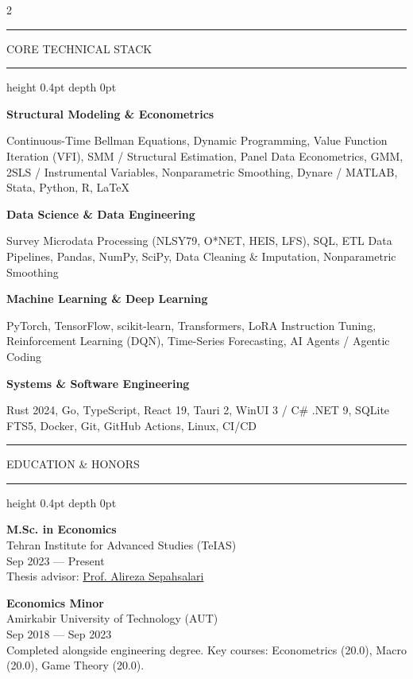 \documentclass[10pt,a4paper]{article}
\newcommand{\scorebadge}[1]{%
  \tcbox[on line, colback=chipbg, colframe=chipborder, arc=2pt, boxrule=0.45pt, boxsep=0pt, left=3.5pt, right=3.5pt, top=1.2pt, bottom=1.2pt]{%
    \scriptsize\bfseries\color{slate800}#1%
  }%
}
\newcommand{\resumesection}[1]{%
  \vspace{4.5pt}%
  \noindent%
  \begingroup%
  \color{ink}\bfseries\fontsize{9pt}{10.5pt}\selectfont%
  \textcolor{accent}{\rule[-0.5pt]{2.5pt}{9pt}}\hspace{4pt}%
  \MakeUppercase{#1}%
  \hspace{4pt}\leaders\hrule height 0.4pt depth 0pt\hfill\null%
  \endgroup%
  \vspace{2.5pt}%
}
\begin{document}
\begin{paracol}{2}
\resumesection{Core Technical Stack}

\noindent
{\raggedright
\textbf{\fontsize{8pt}{9.5pt}\selectfont Structural Modeling \& Econometrics}\\
{\scriptsize Continuous-Time Bellman Equations, Dynamic Programming, Value Function Iteration (VFI), SMM / Structural Estimation, Panel Data Econometrics, GMM, 2SLS / Instrumental Variables, Nonparametric Smoothing, Dynare / MATLAB, Stata, Python, R, LaTeX\par}

\vspace{3.5pt}
\noindent
\textbf{\fontsize{8pt}{9.5pt}\selectfont Data Science \& Data Engineering}\\
{\scriptsize Survey Microdata Processing (NLSY79, O*NET, HEIS, LFS), SQL, ETL Data Pipelines, Pandas, NumPy, SciPy, Data Cleaning \& Imputation, Nonparametric Smoothing\par}

\vspace{3.5pt}
\noindent
\textbf{\fontsize{8pt}{9.5pt}\selectfont Machine Learning \& Deep Learning}\\
{\scriptsize PyTorch, TensorFlow, scikit-learn, Transformers, LoRA Instruction Tuning, Reinforcement Learning (DQN), Time-Series Forecasting, AI Agents / Agentic Coding\par}

\vspace{3.5pt}
\noindent
\textbf{\fontsize{8pt}{9.5pt}\selectfont Systems \& Software Engineering}\\
{\scriptsize Rust 2024, Go, TypeScript, React 19, Tauri 2, WinUI 3 / C\# .NET 9, SQLite FTS5, Docker, Git, GitHub Actions, Linux, CI/CD\par}
}

\resumesection{Education \& Honors}

\noindent
\textbf{M.Sc. in Economics} \hfill \scorebadge{18.72 / 20}\\
{\footnotesize Tehran Institute for Advanced Studies (TeIAS)}\\
{\scriptsize\color{muted} Sep 2023 --- Present}\\
{\scriptsize Thesis advisor: \href{https://www.sepahsalari.com/}{Prof. Alireza Sepahsalari}}

\vspace{4pt}
\noindent
\textbf{Economics Minor} \hfill \scorebadge{19.20 / 20}\\
{\footnotesize Amirkabir University of Technology (AUT)}\\
{\scriptsize\color{muted} Sep 2018 --- Sep 2023}\\
{\scriptsize Completed alongside engineering degree. Key courses: Econometrics (20.0), Macro (20.0), Game Theory (20.0).}


\end{paracol}
\end{document}
